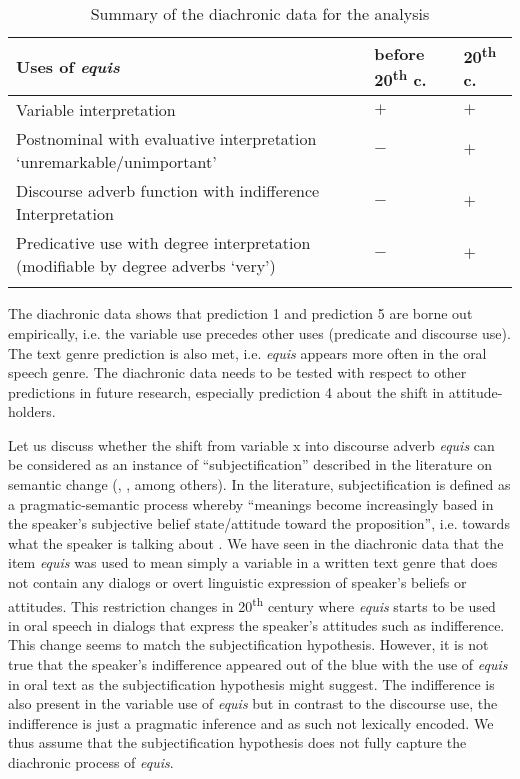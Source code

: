 \documentclass[output=paper]{langsci/langscibook}
\begin{document}
\begin{table}
\caption{Summary of the diachronic data for the analysis\label{tab:4:Summary}}
 \begin{tabular}{p{4cm} p{2cm} p{2cm}}
  \lsptoprule
    Uses of \textit{equis} & \textbf{before 20}\textsuperscript{th} \textbf{c.} & \textbf{20}\textsuperscript{th} \textbf{c.}\\
  \toprule
   \raggedright Variable interpretation & $+$\cellcolor[gray]{0.5} & $+$\cellcolor[gray]{0.5}\\
  \midrule
   \raggedright Postnominal with evaluative interpretation ‘unremarkable/unimportant’ & $-$ & $+$\cellcolor[gray]{0.5}\\
  \midrule
   \raggedright Discourse adverb function with  indifference Interpretation & $-$ & $+$\cellcolor[gray]{0.5}\\
  \midrule
   \raggedright Predicative use with degree interpretation (modifiable by degree adverbs ‘very’) & $-$ & $+$\cellcolor[gray]{0.5}\\
  \lspbottomrule
 \end{tabular}
\end{table}

The diachronic data shows that prediction 1 and prediction 5 are borne out empirically, i.e. the variable use precedes other uses (predicate and discourse use). The text genre prediction is also met, i.e. \textit{equis} appears more often in the oral speech genre. The diachronic data needs to be tested with respect to other predictions in future research, especially prediction 4 about the shift in attitude-holders.

Let us discuss whether the shift from variable x into discourse adverb \textit{equis} can be considered as an instance of “subjectification” described in the literature on semantic change (\citealt{Traugott1995}, \citealt{Company2003}, among others). In the literature, subjectification is defined as a pragmatic-semantic process whereby “meanings become increasingly based in the speaker’s subjective belief state/attitude toward the proposition”, i.e. towards what the speaker is talking about \citep[31]{Traugott1995}. We have seen in the diachronic data that the item \textit{equis} was used to mean simply a variable in a written text genre that does not contain any dialogs or overt linguistic expression of speaker’s beliefs or attitudes. This restriction changes in 20\textsuperscript{th} century where \textit{equis} starts to be used in oral speech in dialogs that express the speaker’s attitudes such as indifference. This change seems to match the subjectification hypothesis. However, it is not true that the speaker’s indifference appeared out of the blue with the use of \textit{equis} in oral text as the subjectification hypothesis might suggest. The indifference is also present in the variable use of \textit{equis} but in contrast to the discourse use, the indifference is just a pragmatic inference and as such not lexically encoded. We thus assume that the subjectification hypothesis does not fully capture the diachronic process of \textit{equis}.
\end{document}
